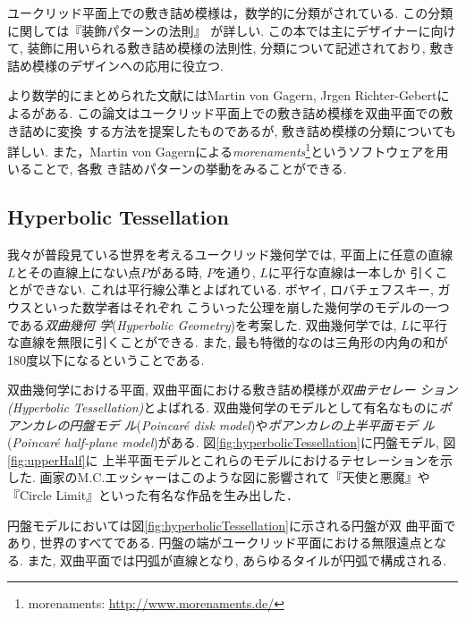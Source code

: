 ユークリッド平面上での敷き詰め模様は，数学的に分類がされている.
この分類に関しては『装飾パターンの法則』
\cite{tessellationDesign}が詳しい.
この本では主にデザイナーに向けて, 装飾に用いられる敷き詰め模様の法則性,
分類について記述されており, 敷き詰め模様のデザインへの応用に役立つ.

より数学的にまとめられた文献にはMartin von Gagern, Jrgen
Richter-Gebertによる\cite{hyperbolization}がある.
この論文はユークリッド平面上での敷き詰め模様を双曲平面での敷き詰めに変換
する方法を提案したものであるが, 敷き詰め模様の分類についても詳しい.
また，Martin von Gagernによる\emph{morenaments}\footnote{morenaments:
\url{http://www.morenaments.de/}}というソフトウェアを用いることで, 各敷
き詰めパターンの挙動をみることができる.

\subsection{Hyperbolic Tessellation}

我々が普段見ている世界を考えるユークリッド幾何学では, 平面上に任意の直線
$L$とその直線上にない点$P$がある時, $P$を通り, $L$に平行な直線は一本しか
引くことができない.
これは平行線公準とよばれている.
ボヤイ, ロバチェフスキー, ガウスといった数学者はそれぞれ
こういった公理を崩した幾何学のモデルの一つである\emph{双曲幾何
学}(\textit{Hyperbolic Geometry})を考案した.
双曲幾何学では, $L$に平行な直線を無限に引くことができる.
また, 最も特徴的なのは三角形の内角の和が180度以下になるということである.

双曲幾何学における平面, 双曲平面における敷き詰め模様が\emph{双曲テセレー
ション}{\it (Hyperbolic Tessellation)}とよばれる.
双曲幾何学のモデルとして有名なものに\emph{ポアンカレの円盤モデ
ル}(\textit{Poincar\'e disk model})や\emph{ポアンカレの上半平面モデ
ル}(\textit{Poincar\'e half-plane model})がある.
図\ref{fig:hyperbolicTessellation}に円盤モデル, 図\ref{fig:upperHalf}に
上半平面モデルとこれらのモデルにおけるテセレーションを示した.
画家のM.C.エッシャーはこのような図に影響されて『天使と悪魔』や『Circle
Limit』といった有名な作品を生み出した．

円盤モデルにおいては図\ref{fig:hyperbolicTessellation}に示される円盤が双
曲平面であり, 世界のすべてである.
円盤の端がユークリッド平面における無限遠点となる.
また, 双曲平面では円弧が直線となり, あらゆるタイルが円弧で構成される.

